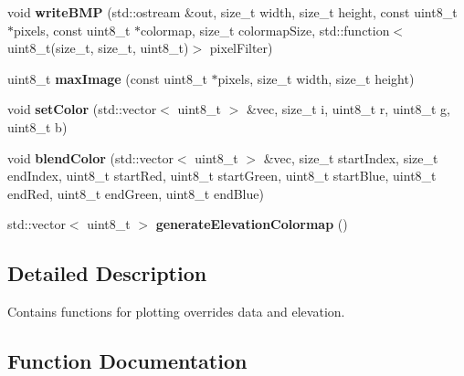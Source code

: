 \begin{DoxyCompactItemize}
\item 
\mbox{\label{namespacevisualizer_a63e82fd57f54a0051c341db82d96b1e4}} 
void {\bfseries write\+B\+MP} (std\+::ostream \&out, size\+\_\+t width, size\+\_\+t height, const uint8\+\_\+t $\ast$pixels, const uint8\+\_\+t $\ast$colormap, size\+\_\+t colormap\+Size, std\+::function$<$ uint8\+\_\+t(size\+\_\+t, size\+\_\+t, uint8\+\_\+t)$>$ pixel\+Filter)
\item 
\mbox{\label{namespacevisualizer_a9cda773a43b5cf710ef2b1e6db058dab}} 
uint8\+\_\+t {\bfseries max\+Image} (const uint8\+\_\+t $\ast$pixels, size\+\_\+t width, size\+\_\+t height)
\item 
\mbox{\label{namespacevisualizer_ac115086a69d45560015dc16c27349a97}} 
void {\bfseries set\+Color} (std\+::vector$<$ uint8\+\_\+t $>$ \&vec, size\+\_\+t i, uint8\+\_\+t r, uint8\+\_\+t g, uint8\+\_\+t b)
\item 
\mbox{\label{namespacevisualizer_a627bff4c6bfe19982566020c2af63497}} 
void {\bfseries blend\+Color} (std\+::vector$<$ uint8\+\_\+t $>$ \&vec, size\+\_\+t start\+Index, size\+\_\+t end\+Index, uint8\+\_\+t start\+Red, uint8\+\_\+t start\+Green, uint8\+\_\+t start\+Blue, uint8\+\_\+t end\+Red, uint8\+\_\+t end\+Green, uint8\+\_\+t end\+Blue)
\item 
\mbox{\label{namespacevisualizer_a6fd4dbb10bbd0b71f19af0e1806f5836}} 
std\+::vector$<$ uint8\+\_\+t $>$ {\bfseries generate\+Elevation\+Colormap} ()
\end{DoxyCompactItemize}


\subsection{Detailed Description}
Contains functions for plotting overrides data and elevation. 

\subsection{Function Documentation}
\mbox{\label{namespacevisualizer_a2f66e38c689ff3c3731faa95739bbf25}} 
